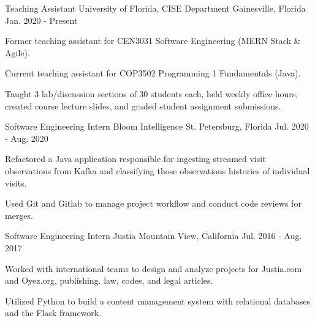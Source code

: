 

\begin{cventries}

  \cventry
    {Teaching Assistant} %
    {University of Florida, CISE Department} %
    {Gainesville, Florida} %
    {Jan. 2020 - Present} %
    {
      \begin{cvitems} %
        \item {Former teaching assistant for CEN3031 Software Engineering (MERN Stack \& Agile).}
        \item {Current teaching assistant for COP3502 Programming 1 Fundamentals (Java).}
        \item {Taught 3 lab/discussion sections of 30 students each, held weekly office hours, created course lecture slides, and graded student assignment submissions.}
      \end{cvitems}
    }

  \cventry
    {Software Engineering Intern} %
    {Bloom Intelligence} %
    {St. Petersburg, Florida} %
    {Jul. 2020 - Aug. 2020} %
    {
      \begin{cvitems} %
        \item {Refactored a Java application responsible for ingesting streamed visit observations from Kafka and classifying those observations  histories of individual visits.}
        \item {Used Git and Gitlab to manage project workflow and conduct code reviews for merges.}
      \end{cvitems}
    }

  \cventry
    {Software Engineering Intern} %
    {Justia} %
    {Mountain View, California} %
    {Jul. 2016 - Aug. 2017} %
    {
      \begin{cvitems} %
        \item {Worked with international teams to design and analyze projects for Justia.com and Oyez.org, publishing. law, codes, and legal articles.}
        \item {Utilized Python to build a content management system with relational databases and the Flask framework.}
      \end{cvitems}
    }



\end{cventries}
